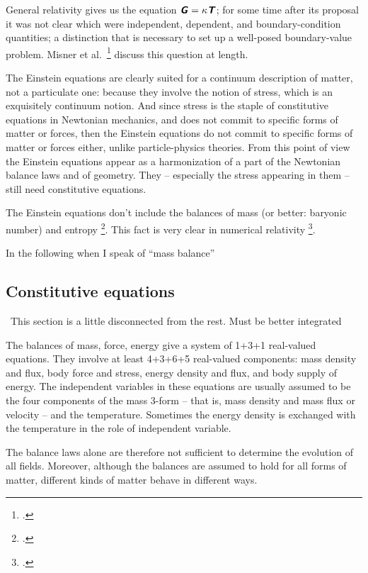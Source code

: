 \documentclass[\ifafour a4paper,12pt,\else a5paper,10pt,\fi%
onecolumn,oneside,article,%
british%
]{memoir}
\theoremstyle{remark}
\theoremstyle{innote}
\newcommand*{\mathte}[1]{\textbf{\textit{\textsf{#1}}}}
\newcommand*{\citep}{\footcites}%
\newcommand*{\citey}{\footcites}%
\renewcommand*{\|}{\nonscript\,\vert\nonscript\;\mathopen{}}
\newcommand*{\sect}{\S}%
\newcommand*{\chap}{ch.}%
\newcommand*{\etal}{{et al.}}
\newcommand*{\puzzle}{{\fontencoding{U}\fontfamily{fontawesometwo}\selectfont\symbol{225}}}
\newcommand{\mynote}[1]{ {\color{notecolour}\puzzle\ #1}}
\newcommand*{\yGG}{G}
\newcommand*{\yG}{\mathte{\yGG}}
\newcommand*{\yTTf}{T}
\newcommand*{\yTf}{\mathte{\yTTf}}
\begin{document}
General relativity gives us the equation $\yG=\kappa\yTf$; for some time
after its proposal it was not clear which were independent, dependent, and
boundary-condition quantities; a distinction that is necessary to set up a
well-posed boundary-value problem. Misner \etal\
\citey[\chap~21]{misneretal1970_r1973} discuss this question at length.

The Einstein equations are clearly suited for a continuum description of
matter, not a particulate one: because they involve the notion of stress,
which is an exquisitely continuum notion. And since stress is the staple of
constitutive equations in Newtonian mechanics, and does not commit to
specific forms of matter or forces, then the Einstein equations do not
commit to specific forms of matter or forces either, unlike
particle-physics theories. From this point of view the Einstein equations
appear as a harmonization of a part of the Newtonian balance laws and of
geometry. They -- especially the stress appearing in them -- still need
constitutive equations.

The Einstein equations don't include the balances of mass (or better:
baryonic number) and entropy
\citep{eckart1940c}[\chap~22]{misneretal1970_r1973}. This fact is very
clear in numerical relativity
\citep[p.~1918]{disconzi2014}[\sect~2.2]{wilsonetal2003_r2007}[\sect~6.3.2]{gourgoulhon2007_r2012}[\chap~5]{baumgarteetal2010}[\sect~2.3]{rezzollaetal2013}.

In the following when I speak of \enquote{mass balance}

\subsection{Constitutive equations}
\label{sec:constitutive equations}

\mynote{This section is a little disconnected from the rest. Must be better
integrated}

The balances of mass, force, energy give a system of 1+3+1 real-valued
equations. They involve at least 4+3+6+5 real-valued components: mass
density and flux, body force and stress, energy density and flux, and body
supply of energy. The independent variables in these equations are usually
assumed to be the four components of the mass 3-form -- that is, mass
density and mass flux or velocity -- and the temperature. Sometimes the
energy density is exchanged with the temperature in the role of independent
variable.

The balance laws alone are therefore not sufficient to determine the
evolution of all fields. Moreover, although the balances are assumed to
hold for all forms of matter, different kinds of matter behave in different
ways.
\end{document}
